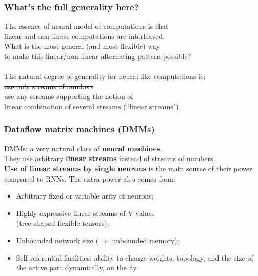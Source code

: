 \documentclass{beamer}
\newcommand{\msmagenta}[1]{{\color{mymagenta} #1}}
\begin{document}
\begin{frame}

\frametitle{What's the full generality here?}

The essence of neural model of computations is that\\
\msmagenta{linear and non-linear computations are interleaved.}\\[2ex] 

What is the most general (and most flexible) way\\
to make this linear/non-linear alternating pattern possible?\\[2ex]

\dotfill\\[2ex]

The natural degree of generality for neural-like computations is:\\[2ex]
\hspace{0.2in}\sout{use only streams of numbers}\\
\hspace{0.2in}use any streams supporting the notion of\\
\hspace{0.6in}linear combination of several streams \msmagenta{(``linear streams")}

\end{frame}

\begin{frame}

  \frametitle{\msmagenta{Dataflow matrix machines (DMMs)}}

DMMs: a very natural class of {\bf neural machines}.\\[2ex]

They use arbitrary {\bf linear streams} instead of streams of numbers.\\[2ex]

{\bf Use of linear streams by single neurons} is the main source of their power compared to RNNs.
The extra power also comes from:\\[1ex]

\begin{itemize}

\item Arbitrary fixed or variable arity of neurons;\\[2ex]

\item Highly expressive linear streams of V-values\\ (tree-shaped flexible tensors);\\[2ex]

\item Unbounded network size ($\Rightarrow$ unbounded memory);\\[2ex]

\item Self-referential facilities: ability to change weights, topology, and the size of the active part dynamically, on the fly.

\end{itemize}

\end{frame}
\end{document}
